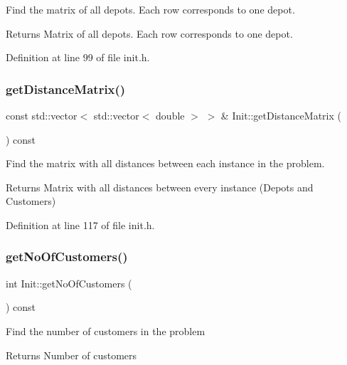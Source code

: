 Find the matrix of all depots. Each row corresponds to one depot. \begin{DoxyReturn}{Returns}
Matrix of all depots. Each row corresponds to one depot. 
\end{DoxyReturn}


Definition at line 99 of file init.\+h.

\mbox{\label{class_init_a023ffffca04fa97b54a847cb02b5d0c1}} 
\subsubsection{\texorpdfstring{get\+Distance\+Matrix()}{getDistanceMatrix()}}
{\footnotesize\ttfamily const std\+::vector$<$ std\+::vector$<$ double $>$ $>$ \& Init\+::get\+Distance\+Matrix (\begin{DoxyParamCaption}{ }\end{DoxyParamCaption}) const\hspace{0.3cm}{\ttfamily [inline]}}

Find the matrix with all distances between each instance in the problem. \begin{DoxyReturn}{Returns}
Matrix with all distances between every instance (Depots and Customers) 
\end{DoxyReturn}


Definition at line 117 of file init.\+h.

\mbox{\label{class_init_aa734c4109c33931c0b038b622b867c18}} 
\subsubsection{\texorpdfstring{get\+No\+Of\+Customers()}{getNoOfCustomers()}}
{\footnotesize\ttfamily int Init\+::get\+No\+Of\+Customers (\begin{DoxyParamCaption}{ }\end{DoxyParamCaption}) const\hspace{0.3cm}{\ttfamily [inline]}}

Find the number of customers in the problem \begin{DoxyReturn}{Returns}
Number of customers 
\end{DoxyReturn}


